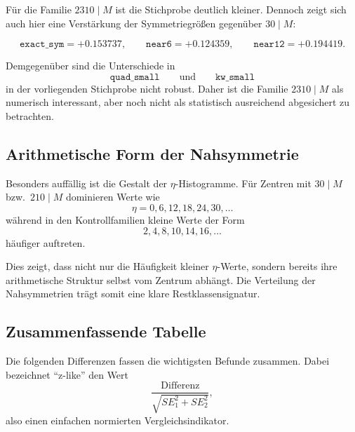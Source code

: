 \documentclass[11pt,a4paper]{article}
\theoremstyle{definition}
\theoremstyle{plain}
\theoremstyle{remark}
\begin{document}
	Für die Familie $2310\mid M$ ist die Stichprobe deutlich kleiner. 
	Dennoch zeigt sich auch hier eine Verstärkung der Symmetriegrößen gegenüber $30\mid M$:
	
	\[
	\texttt{exact\_sym}=+0.153737,\qquad
	\texttt{near6}=+0.124359,\qquad
	\texttt{near12}=+0.194419.
	\]
	
	Demgegenüber sind die Unterschiede in
	\[
	\texttt{quad\_small}
	\qquad\text{und}\qquad
	\texttt{kw\_small}
	\]
	in der vorliegenden Stichprobe nicht robust. 
	Daher ist die Familie $2310\mid M$ als numerisch interessant, aber noch nicht als statistisch ausreichend abgesichert zu betrachten.
	
	\subsection{Arithmetische Form der Nahsymmetrie}
	
	Besonders auffällig ist die Gestalt der $\eta$-Histogramme. 
	Für Zentren mit $30\mid M$ bzw.\ $210\mid M$ dominieren Werte wie
	\[
	\eta=0,6,12,18,24,30,\dots
	\]
	während in den Kontrollfamilien kleine Werte der Form
	\[
	2,4,8,10,14,16,\dots
	\]
	häufiger auftreten.
	
	Dies zeigt, dass nicht nur die Häufigkeit kleiner $\eta$-Werte, sondern bereits ihre arithmetische Struktur selbst vom Zentrum abhängt. 
	Die Verteilung der Nahsymmetrien trägt somit eine klare Restklassensignatur.
	
	\subsection{Zusammenfassende Tabelle}
	
	Die folgenden Differenzen fassen die wichtigsten Befunde zusammen. 
	Dabei bezeichnet ``z-like'' den Wert
	\[
	\frac{\text{Differenz}}{\sqrt{SE_1^2+SE_2^2}},
	\]
	also einen einfachen normierten Vergleichsindikator.
	
\end{document}
